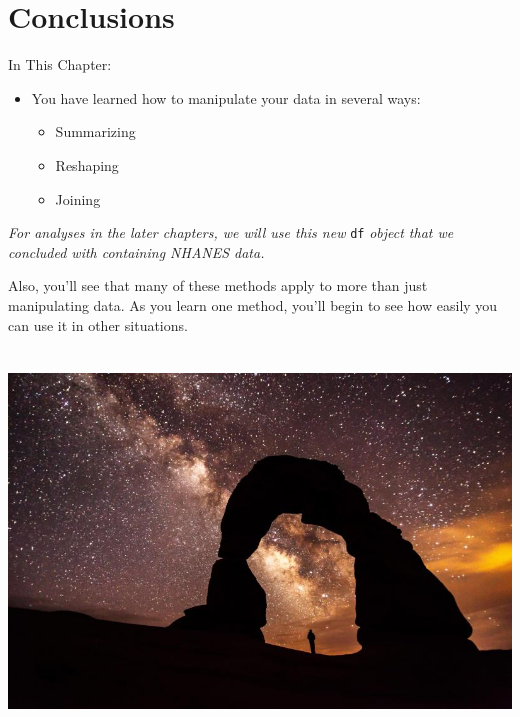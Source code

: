\section{Conclusions}\label{conclusions}

\begin{frame}[fragile]{In This Chapter:}

\begin{itemize}
\tightlist
\item
  You have learned how to manipulate your data in several ways:

  \begin{itemize}
  \tightlist
  \item
    Summarizing
  \item
    Reshaping
  \item
    Joining
  \end{itemize}
\end{itemize}

\emph{For analyses in the later chapters, we will use this new}
\texttt{df} \emph{object that we concluded with containing NHANES data.}

Also, you'll see that many of these methods apply to more than just
manipulating data. As you learn one method, you'll begin to see how
easily you can use it in other situations.

\end{frame}

\begin{frame}

\centerline{\includegraphics[height=4in]{Figures/delicate_arch.jpg}}

\end{frame}
